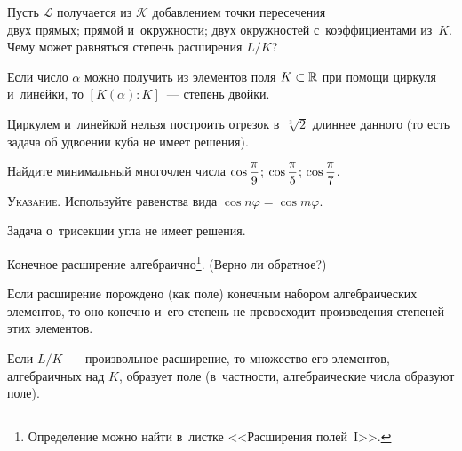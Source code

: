 \documentclass[a4paper, 12pt]{article}
\begin{document}
Пусть $\mathcal L$ получается из $\mathcal K$ добавлением точки пересечения\\
 двух прямых;  прямой и~окружности;  двух окружностей с~коэффициентами из~$K$.\\
Чему может равняться степень расширения $L/K$?






Если число $\alpha$ можно получить из элементов поля $K\subset\mathbb{R}$ при помощи циркуля и~линейки, то $[K(\alpha):K]$~--- степень двойки.






Циркулем и~линейкой нельзя построить отрезок в~$\sqrt[3]2$ длиннее данного (то есть задача об удвоении куба не имеет решения).






Найдите минимальный многочлен числа
 $\cos\smash{\dfrac\pi9}$;  $\cos\smash{\dfrac\pi5}$;  $\cos\smash{\dfrac\pi7}$.

\noindent
\small{\textsc{Указание.} Используйте равенства вида $\cos n\varphi=\cos m\varphi$.}






Задача о~трисекции угла не имеет решения.







 Конечное расширение алгебраично\footnote{Определение можно найти в~листке <<Расширения полей~I>>.}. (Верно ли обратное?)

 Если расширение порождено (как поле) конечным набором алгебраических элементов, то оно конечно и~его степень не превосходит произведения степеней этих элементов.






Если $L/K$~--- произвольное расширение, то множество его элементов, алгебраичных над $K$, образует поле (в~частности, алгебраические числа образуют поле).











\end{document}
